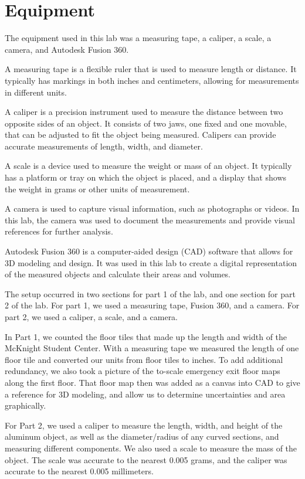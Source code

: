 \documentclass{article}
\begin{document}
\section{Equipment}

The equipment used in this lab was a measuring tape, a caliper, a scale, a camera, and Autodesk Fusion 360.

A measuring tape is a flexible ruler that is used to measure length or distance. It typically has markings in both inches and centimeters, allowing for measurements in different units.

A caliper is a precision instrument used to measure the distance between two opposite sides of an object. It consists of two jaws, one fixed and one movable, that can be adjusted to fit the object being measured. Calipers can provide accurate measurements of length, width, and diameter.

A scale is a device used to measure the weight or mass of an object. It typically has a platform or tray on which the object is placed, and a display that shows the weight in grams or other units of measurement.

A camera is used to capture visual information, such as photographs or videos. In this lab, the camera was used to document the measurements and provide visual references for further analysis.

Autodesk Fusion 360 is a computer-aided design (CAD) software that allows for 3D modeling and design. It was used in this lab to create a digital representation of the measured objects and calculate their areas and volumes.

The setup occurred in two sections for part 1 of the lab, and one section for part 2 of the lab. For part 1, we used a measuring tape, Fusion 360, and a camera. For part 2, we used a caliper, a scale, and a camera.

In Part 1, we counted the floor tiles that made up the length and width of the McKnight Student Center. With a measuring tape we measured the length of one floor tile and converted our units from floor tiles to inches. To add additional redundancy, we also took a picture of the to-scale emergency exit floor maps along the first floor. That floor map then was added as a canvas into CAD to give a reference for 3D modeling, and allow us to determine uncertainties and area graphically.   

For Part 2, we used a caliper to measure the length, width, and height of the aluminum object, as well as the diameter/radius of any curved sections, and measuring different components. We also used a scale to measure the mass of the object. The scale was accurate to the nearest 0.005 grams, and the caliper was accurate to the nearest 0.005 millimeters.
\end{document}
